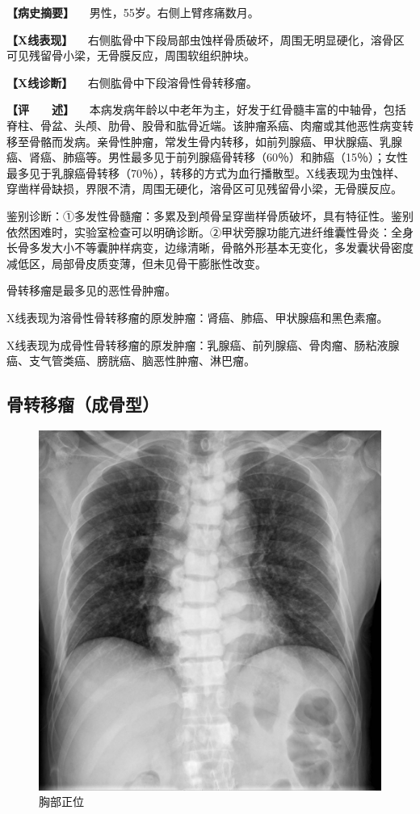 \textbf{【病史摘要】} 　男性，55岁。右侧上臂疼痛数月。

\textbf{【X线表现】}
　右侧肱骨中下段局部虫蚀样骨质破坏，周围无明显硬化，溶骨区可见残留骨小梁，无骨膜反应，周围软组织肿块。

\textbf{【X线诊断】} 　右侧肱骨中下段溶骨性骨转移瘤。

\textbf{【评　　述】}
　本病发病年龄以中老年为主，好发于红骨髓丰富的中轴骨，包括脊柱、骨盆、头颅、肋骨、股骨和肱骨近端。该肿瘤系癌、肉瘤或其他恶性病变转移至骨骼而发病。亲骨性肿瘤，常发生骨内转移，如前列腺癌、甲状腺癌、乳腺癌、肾癌、肺癌等。男性最多见于前列腺癌骨转移（60％）和肺癌（15％）；女性最多见于乳腺癌骨转移（70％），转移的方式为血行播散型。X线表现为虫蚀样、穿凿样骨缺损，界限不清，周围无硬化，溶骨区可见残留骨小梁，无骨膜反应。

鉴别诊断：①多发性骨髓瘤：多累及到颅骨呈穿凿样骨质破坏，具有特征性。鉴别依然困难时，实验室检查可以明确诊断。②甲状旁腺功能亢进纤维囊性骨炎：全身长骨多发大小不等囊肿样病变，边缘清晰，骨骼外形基本无变化，多发囊状骨密度减低区，局部骨皮质变薄，但未见骨干膨胀性改变。

骨转移瘤是最多见的恶性骨肿瘤。

X线表现为溶骨性骨转移瘤的原发肿瘤：肾癌、肺癌、甲状腺癌和黑色素瘤。

X线表现为成骨性骨转移瘤的原发肿瘤：乳腺癌、前列腺癌、骨肉瘤、肠粘液腺癌、支气管类癌、膀胱癌、脑恶性肿瘤、淋巴瘤。

\subsection{骨转移瘤（成骨型）}

\begin{figure}[!htbp]
 \centering
 \includegraphics{./images/Image00107.jpg}
 \captionsetup{justification=centering}
 \caption{胸部正位}
 \label{fig2-7-22}
  \end{figure} 

